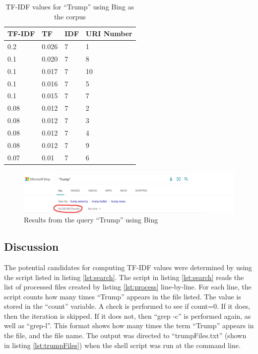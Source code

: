 \documentclass[12pt]{article}
\begin{document}
\begin{table}[h]

\centering
\caption{TF-IDF values for ``Trump'' using Bing as the corpus}
\label{tbl:TFIDF}
\begin{tabular}{|l|l|l||l|}
\hline
\textbf{TF-IDF} & \textbf{TF} & \textbf{IDF} & \textbf{URI Number} \\ \hline
0.2 & 0.026 & 7 & 1 \\ \hline
0.1 & 0.020 & 7 & 8 \\ \hline
0.1 & 0.017 & 7 & 10 \\ \hline
0.1 & 0.016 & 7 & 5 \\ \hline
0.1 & 0.015 & 7 & 7 \\ \hline
0.08 & 0.012 & 7 & 2 \\ \hline
0.08 & 0.012 & 7 & 3 \\ \hline
0.08 & 0.012 & 7 & 4 \\ \hline
0.08 & 0.012 & 7 & 9 \\ \hline
0.07 & 0.01 & 7 & 6 \\ \hline


\end{tabular}
\end{table}

\begin{figure}[h]

    \centering
    \includegraphics[trim=0 0 280 0]{trumpBingResults.png}
    \caption{Results from the query ``Trump'' using Bing}
    \label{fig:query_results}
    
\end{figure}

\subsection*{Discussion}
The potential candidates for computing TF-IDF values were determined by using the script listed in listing \ref{lst:search}.  The script in listing \ref{lst:search} reads the list of processed files created by listing \ref{lst:process} line-by-line.  For each line, the script counts how many times ``Trump'' appears in the file listed.  The value is stored in the ``count'' variable.  A check is performed to see if count=0.  If it does, then the iteration is skipped.  If it does not, then ``grep -c'' is performed again, as well as ``grep-l''.  This format shows how many times the term ``Trump'' appears in the file, and the file name.  The output was directed to ``trumpFiles.txt'' (shown in listing \ref{lst:trumpFiles}) when the shell script was run at the command line.  
\end{document}
